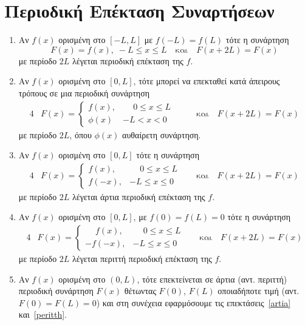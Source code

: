 \section{Περιοδική Επέκταση Συναρτήσεων}

\vspace{\baselineskip}

\begin{enumerate}

  \item Αν $ f(x) $ ορισμένη στο $ [-L,L] $ με $ f(-L)=f(L) $ τότε η συνάρτηση
    \[
      F(x) = f(x), \; -L \leq x \leq L \quad \text{και} \quad F(x+2L)=F(x)
    \]
    με περίοδο $ 2L $ λέγεται \textcolor{Col1}{περιοδική επέκταση} της $f$. 

  \item Αν $ f(x) $ ορισμένη στο $ [0,L] $, τότε μπορεί να επεκταθεί 
    κατά άπειρους τρόπους σε μια περιοδική συνάρτηση 
    \begin{alignat*}{4}
            &F(x) = 
            \begin{cases}  
              f(x), & \phantom{-} 0 \leq x \leq L \\
              \phi(x) & -L < x < 0
            \end{cases}  & \quad & \text{και} \quad F(x+2L)=F(x)
    \end{alignat*}
    με περίοδο $ 2L $, όπου $ \phi(x) $ αυθαίρετη συνάρτηση. 

  \item\label{artia} Αν $ f(x) $ ορισμένη στο $ [0,L] $ τότε η συνάρτηση 
    \begin{alignat*}{4}
            & F(x) = 
            \begin{cases}  
              f(x), & \phantom{-} 0 \leq x \leq L \\
              f(-x), & -L \leq x \leq 0
            \end{cases}  & \quad \text{και} \quad F(x+2L)=F(x)
    \end{alignat*}
    με περίοδο $ 2L $ λέγεται \textcolor{Col1}{άρτια περιοδική επέκταση} της $f$.

  \item\label{peritth} Αν $ f(x) $ ορισμένη στο $ [0,L] $, με $ f(0)=f(L)=0 $ 
    τότε η συνάρτηση
    \begin{alignat*}{4}
            &F(x) = 
            \begin{cases}  
              \phantom{-} f(x), & \phantom{-} 0 \leq x \leq L \\
              -f(-x), & -L \leq x \leq 0
            \end{cases}  & \quad \text{και} \quad F(x+2L)=F(x)
    \end{alignat*}
    με περίοδο $ 2L $ λέγεται \textcolor{Col1}{περιττή περιοδική επέκταση} της $f$.

  \item Αν $ f(x) $ ορισμένη στο $ (0,L) $, τότε επεκτείνεται σε 
    άρτια (αντ. περιττή) περιοδική συνάρτηση $ F(x) $ θέτωντας $ F(0) $, 
    $ F(L) $ οποιαδήποτε τιμή (αντ. $F(0)=F(L)=0$) και στη συνέχεια εφαρμόσουμε 
    τις επεκτάσεις~\ref{artia} και~\ref{peritth}.
\end{enumerate}


